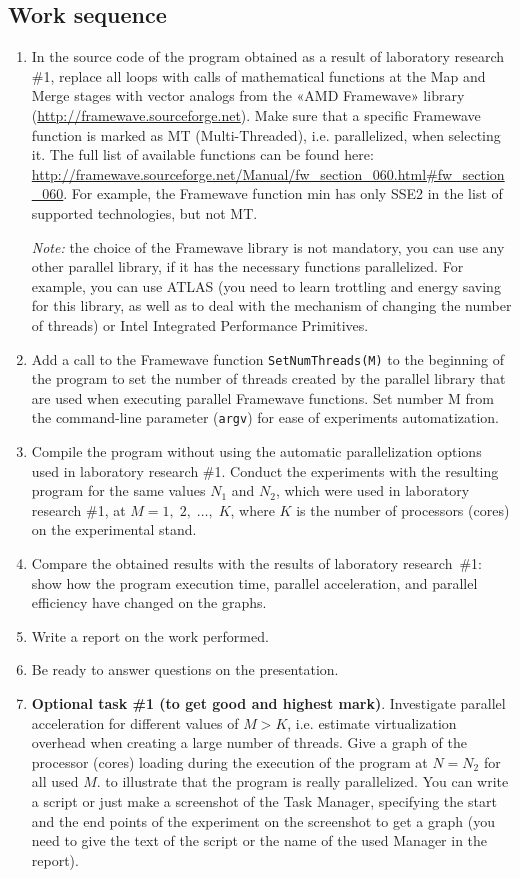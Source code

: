 { %
	\subsection{Work sequence}
	\begin{enumerate}
		\item In the source code of the program obtained as a result of laboratory research \#1, replace all loops with calls of mathematical functions at the Map and Merge stages with vector analogs from the «AMD Framewave» library (\url{http://framewave.sourceforge.net}). Make sure that a specific Framewave function is marked as MT (Multi-Threaded), i.e. parallelized, when selecting it. The full list of available functions can be found here: \\{\small \url{http://framewave.sourceforge.net/Manual/fw_section_060.html#fw_section_060}}. For example, the Framewave function min has only SSE2 in the list of supported technologies, but not MT. 
			\par\textit{Note:} the choice of the Framewave library is not mandatory, you can use any other parallel library, if it has the necessary functions parallelized. For example, you can use ATLAS (you need to learn trottling and energy saving for this library, as well as to deal with the mechanism of changing the number of threads) or Intel Integrated Performance Primitives.
		\item Add a call to the Framewave function \texttt{SetNumThreads(M)} to the beginning of the program to set the number of threads created by the parallel library that are used when executing parallel Framewave functions. Set number M from the command-line parameter (\texttt{argv}) for ease of experiments automatization.
		\item Compile the program without using the automatic parallelization options used in laboratory research \#1. Conduct the experiments with the resulting program for the same values $N_1$ and $N_2$, which were used in laboratory research \#1, at $M=1,\;2,\;…,\;K$, where $K$ is the number of processors (cores) on the experimental stand.
		\item Compare the obtained results with the results of laboratory research~\#1: show how the program execution time, parallel acceleration, and parallel efficiency have changed on the graphs.
		\item Write a report on the work performed.
		\item Be ready to answer questions on the presentation.
		\item\textbf{Optional task \#1 (to get good and highest mark)}. Investigate parallel acceleration for different values of $M > K$, i.e. estimate virtualization overhead when creating a large number of threads. Give a graph of the processor (cores) loading during the execution of the program at $N=N_2$ for all used $M$. to illustrate that the program is really parallelized. You can write a script or just make a screenshot of the Task Manager, specifying the start and the end points of the experiment on the screenshot to get a graph (you need to give the text of the script or the name of the used Manager in the report).

\end{enumerate}}
